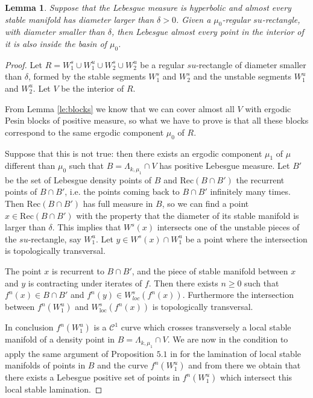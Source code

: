 \documentclass[11pt,letterpaper,reqno]{article}
\newtheorem{lemma}{Lemma}[section]
\newcommand{\Wsloc}[1]{W^{s}_{\mathrm{loc}}(#1)}
\begin{document}
\begin{lemma}\label{le:interior}
Suppose that the Lebesgue measure is hyperbolic and almost every stable manifold has diameter larger than $\delta>0$. Given a $\mu_0$-regular $su$-rectangle, with diameter smaller than $\delta$, then Lebesgue almost every point in the interior of it is also inside the basin of $\mu_0$.
\end{lemma}

\begin{proof}
Let $R=W^s_1\cup W^u_1\cup W^s_2\cup W^u_2$ be a regular $su$-rectangle of diameter smaller than $\delta$, formed by the stable segments $W^s_1$ and $W^s_2$ and the unstable segments $W^u_1$ and $W^u_2$. Let $V$ be the interior of $R$.

From Lemma \ref{le:blocks} we know that we can cover almost all $V$ with ergodic Pesin blocks of positive measure, so what we have to prove is that all these blocks correspond to the same ergodic component $\mu_0$ of $R$.

Suppose that this is not true: then there exists an ergodic component $\mu_1$ of $\mu$ different than $\mu_0$ such that $B=\Lambda_{k,\mu_1}\cap V$ has positive Lebesgue measure. Let $B'$ be the set of Lebesgue density points of $B$ and $\mathrm{Rec}(B\cap B')$ the recurrent points of $B\cap B'$, i.e. the points coming back to $B\cap B'$ infinitely many times. Then $\mathrm{Rec}(B\cap B')$ has full measure in $B$, so we can find a point $x\in \mathrm{Rec}(B\cap B')$ with the property that the diameter of its stable manifold is larger than $\delta$. This implies that $W^s(x)$ intersects one of the unstable pieces of the $su$-rectangle, say $W^u_1$. Let $y\in W^s(x)\cap W^u_1$ be a point where the intersection is topologically transversal.

The point $x$ is recurrent to $B\cap B'$, and the piece of stable manifold between $x$ and $y$ is contracting under iterates of $f$. Then there exists $n\geq 0$ such that $f^n(x)\in B\cap B'$ and $f^n(y)\in W^s_{loc}(f^n(x))$. Furthermore the intersection between $f^n(W^u_1)$ and $\Wsloc{f^n(x})$ is topologically transversal.

In conclusion $f^n(W^u_1)$ is a $\mathcal C^1$ curve which crosses transversely a local stable manifold of a density point in $B=\Lambda_{k,\mu_1}\cap V$. We are now in the condition to apply the same argument of Proposition $5.1$ in \cite{Hertz2011} for the lamination of local stable manifolds of points in $B$ and the curve $f^n(W^u_1)$ and from there we obtain that there exists a Lebesgue positive set of points in $f^n(W^u_1)$ which intersect this local stable lamination.


\end{proof}
\end{document}
